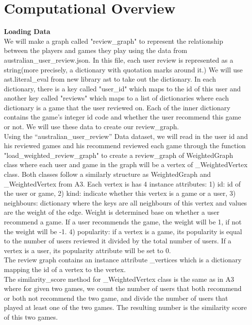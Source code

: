 \documentclass{article}
\begin{document}
\section{Computational Overview}
\textbf{Loading Data} \\
We will make a graph called "review\_graph" to represent the relationship between the players and games they play using the data from australian\_user\_review.json. In this file, each user review is represented as a string(more precisely, a dictionary with quotation marks around it.) We will use ast.literal\_eval from new library ast to take out the dictionary. In each dictionary, there is a key called "user\_id" which maps to the id of this user and another key called "reviews" which maps to a list of dictionaries where each dictionary is a game that the user reviewed on. Each of the inner dictionary contains the game's integer id code and whether the user recommend this game or not. We will use these data to create our review\_graph.\\
Using the “australian\_user\_review” Data dataset, we will read in the user id and his reviewed games and his recommend reviewed each game through the function "load\_weighted\_review\_graph" to create a review\_graph of WeightedGraph class where each user and game in the graph will be a vertex of \_WeightedVertex class. Both classes follow a similarly structure as WeightedGraph and \_WeightedVertex from A3. Each vertex is has 4 instance attributes: 1) id: id of the user or game, 2) kind: indicate whether this vertex is a game or a user, 3) neighbours: dictionary where the keys are all neighbours of this vertex and values are the weight of the edge. Weight is determined base on whether a user recommend a game. If a user recommends the game, the weight will be 1, if not the weight will be -1. 4) popularity: if a vertex is a game, its popularity is equal to the number of users reviewed it divided by the total number of users. If a vertex is a user, its popularity attribute will be set to 0.\\
The review graph contains an instance attribute \_vertices which is a dictionary mapping the id of a vertex to the vertex.\\
The similarity\_score method for \_WeightedVertex class is the same as in A3 where for given two games, we count the number of users that both recommend or both not recommend the two game, and divide the number of users that played at least one of the two games. The resulting number is the similarity score of this two games.\\\\
\end{document}
